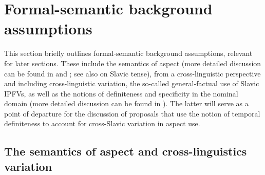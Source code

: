 \documentclass[output=paper,colorlinks,citecolor=brown]{langscibook}
\begin{document}
\section{Formal-semantic background assumptions}
\label{sec:formsemasp}
\largerpage

This section briefly outlines formal-semantic background assumptions, relevant for later sections. These include the semantics of aspect (more detailed discussion can be found in  and ; see also  on Slavic tense), from a cross-linguistic perspective and including cross-linguistic variation, the so-called general-factual use of Slavic IPFVs, as well as the notions of definiteness and specificity in the nominal domain (more detailed discussion can be found in ). The latter will serve as a point of departure for the discussion of proposals that use the notion of temporal definiteness to account for cross-Slavic variation in aspect use. 

\subsection{The semantics of aspect and cross-linguistics variation}
\end{document}
